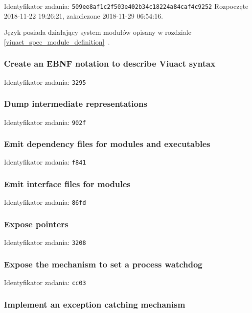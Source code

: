 Identyfikator zadania: \texttt{509ee8af1c2f503e402b34c18224a84caf4c9252}
\newline
Rozpoczęte 2018-11-22 19:26:21, zakończone 2018-11-29 06:54:16.
\newline

Język \ViuAct\phantom{} posiada działający system modułów opisany w rozdziale
\ref{viuact_spec_module_definition}~.

\subsubsection{Create an EBNF notation to describe Viuact syntax}

Identyfikator zadania: \texttt{3295}

\subsubsection{Dump intermediate representations}

Identyfikator zadania: \texttt{902f}

\subsubsection{Emit dependency files for modules and executables}

Identyfikator zadania: \texttt{f841}

\subsubsection{Emit interface files for modules}

Identyfikator zadania: \texttt{86fd}

\subsubsection{Expose pointers}

Identyfikator zadania: \texttt{3208}

\subsubsection{Expose the mechanism to set a process watchdog}

Identyfikator zadania: \texttt{cc03}

\subsubsection{Implement an exception catching mechanism}

